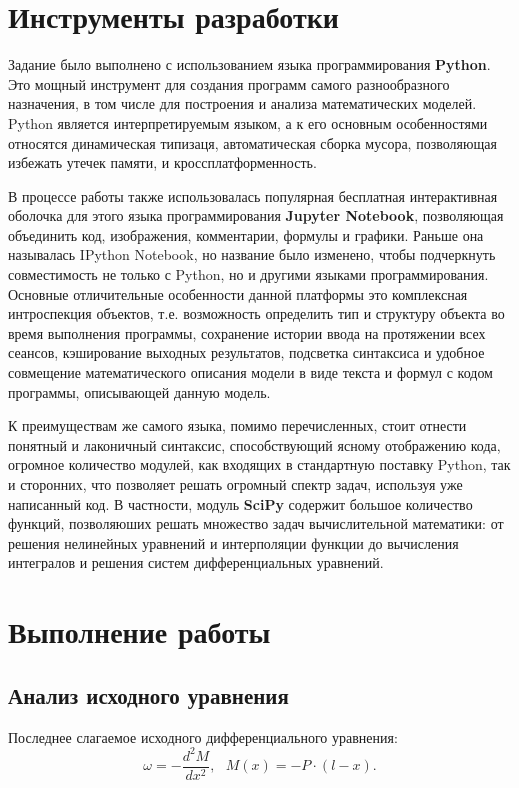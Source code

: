 \section{Инструменты разработки}

Задание было выполнено с использованием языка программирования \textbf{Python}. Это мощный инструмент для создания программ самого разнообразного назначения, в том числе для построения и анализа математических моделей. Python является интерпретируемым языком, а к его основным особенностями относятся динамическая типизаця, автоматическая сборка мусора, позволяющая избежать утечек памяти, и кроссплатформенность. 

В процессе работы также использовалась популярная бесплатная интерактивная оболочка для этого языка программирования \textbf{Jupyter Notebook}, позволяющая объединить код, изображения, комментарии, формулы и графики. Раньше она называлась IPython Notebook, но название было изменено, чтобы подчеркнуть совместимость не только с Python, но и другими языками программирования. Основные отличительные особенности данной платформы  это комплексная интроспекция объектов, т.е. возможность определить тип и структуру объекта во время выполнения программы, сохранение истории ввода на протяжении всех сеансов, кэширование выходных результатов, подсветка синтаксиса и удобное совмещение математического описания модели в виде текста и формул с кодом программы, описывающей данную модель. 

К преимуществам же самого языка, помимо перечисленных, стоит отнести понятный и лаконичный синтаксис, способствующий ясному отображению кода, огромное количество модулей, как входящих в стандартную поставку Python, так и сторонних, что позволяет решать огромный спектр задач, используя уже написанный код. В частности, модуль \textbf{SciPy} содержит большое количество функций, позволяюших решать множество задач вычислительной математики: от решения нелинейных уравнений и интерполяции функции до вычисления интегралов и решения систем дифференциальных уравнений.

\section{Выполнение работы}

\subsection{Анализ исходного уравнения}

Последнее слагаемое исходного дифференциального уравнения:
\[
	\omega = -\frac{d^2M}{dx^2},\ \ \ M(x) = -P \cdot (l - x).
\]

